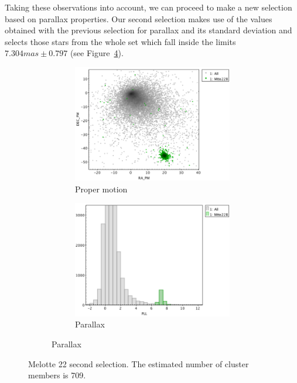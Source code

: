 \documentclass[11pt, a4paper, english]{book}
\begin{document}
Taking these observations into account,
we can proceed to make a new selection based on parallax properties.
Our second selection makes use of the values obtained with the previous selection
for parallax and its standard deviation and selects those stars from the whole set
which fall inside the limits \(7.304mas \pm 0.797\) (see Figure~\ref{fig:topcat_parallax_melotte_22}).

\begin{figure}[htbp]
  \centering
  \begin{subfigure}{0.9\textwidth}
    \centering
    \begin{subfigure}[t]{0.45\textwidth}
      \centering
      \includegraphics[width=\textwidth]{../figures/clusterix/topcat_2nd_selection_pm_melotte_22.png}
      \caption{Proper motion}
      \label{fig:topcat_2nd_selection_pm_melotte_22}
    \end{subfigure}
    \hfill
    \begin{subfigure}[t]{0.45\textwidth}
      \centering
      \includegraphics[width=\textwidth]{../figures/clusterix/topcat_2nd_selection_parallax_melotte_22.png}
      \caption{Parallax}
      \label{fig:topcat_2nd_selection_parallax_melotte_22}
    \end{subfigure}
  \end{subfigure}
  \caption{Melotte 22 second selection. The estimated number of cluster members is 709.}
  \label{fig:topcat_parallax_melotte_22}
\end{figure}
\end{document}
